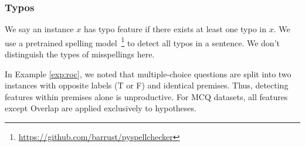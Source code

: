 \subsubsection{Typos}
We say an instance $x$ has typo feature if there exists at least one
typo in $x$.
We use a pretrained spelling model~\footnote{\url{https://github.com/barrust/pyspellchecker}} 
to detect all typos in a sentence. We don't distinguish the types of misspellings here. 

In Example \ref{exp:roc}, we noted that multiple-choice 
questions are split into two instances with opposite 
labels (T or F) and identical premises. Thus, 
detecting features within premises alone is unproductive. 
For MCQ datasets, all features except Overlap are applied exclusively to hypotheses.


